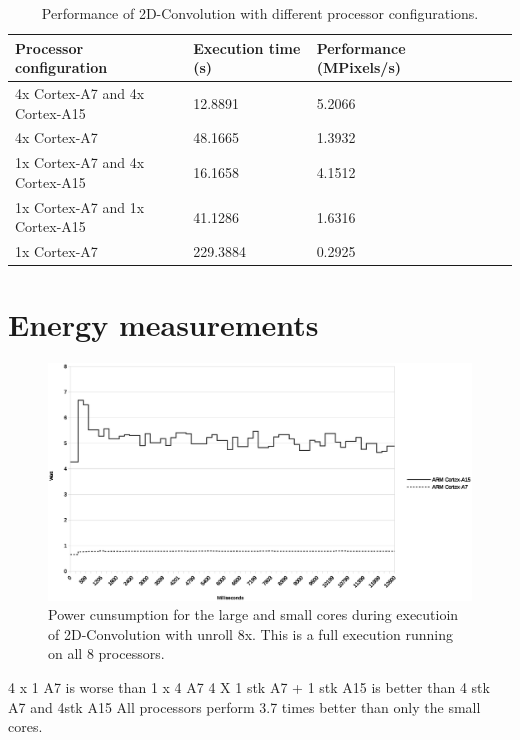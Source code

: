 \begin{table}[H]
  \begin{tabular}{llllll}
    \toprule
    Processor configuration           & Execution time (s)  & Performance (MPixels/s) \\
    \midrule
    4x Cortex-A7 and 4x Cortex-A15    & 12.8891             & 5.2066\\
    4x Cortex-A7                      & 48.1665             & 1.3932\\
    1x Cortex-A7 and 4x Cortex-A15    & 16.1658             & 4.1512\\
    1x Cortex-A7 and 1x Cortex-A15    & 41.1286             & 1.6316\\
    1x Cortex-A7                      & 229.3884            & 0.2925\\
    \bottomrule
  \end{tabular}
  \caption{Performance of 2D-Convolution with different processor configurations. \label{overflow}}
\end{table}

\section{Energy measurements}
\begin{figure}[H]
  \centering
  \includegraphics[width=160mm]{fig/power-over-time.eps}
  \caption{Power cunsumption for the large and small cores during executioin of 2D-Convolution with unroll 8x. This is a full execution running on all 8 processors. \label{overflow}}
\end{figure}

4 x 1 A7 is worse than 1 x 4 A7
4 X 1 stk A7 + 1 stk A15 is better than 4 stk A7 and 4stk A15
All processors perform 3.7 times better than only the small cores.

